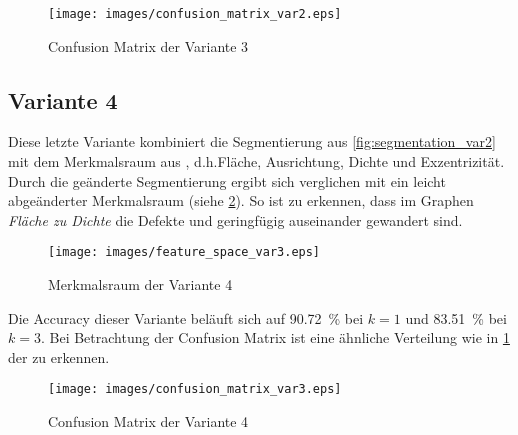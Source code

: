 \begin{figure}[ht]
    \centering
    \texttt{[image: images/confusion\_matrix\_var2.eps]}
    \caption{\foreignlanguage{english}{Confusion Matrix} der Variante 3\label{fig:confusion_matrix_var2}}
\end{figure}

\FloatBarrier{}

\subsection{Variante 4\label{sct:variant3}}

Diese letzte Variante kombiniert die Segmentierung aus \cref{fig:segmentation_var2} mit dem Merkmalsraum aus , d.h.\@ Fläche, Ausrichtung, Dichte und Exzentrizität. Durch die geänderte Segmentierung ergibt sich verglichen mit  ein leicht abgeänderter Merkmalsraum (siehe \cref{fig:feature_space_var3}). So ist zu erkennen, dass im Graphen \emph{Fläche zu Dichte} die Defekte  und  geringfügig auseinander gewandert sind.

\begin{figure}[ht]
    \centering
    \texttt{[image: images/feature\_space\_var3.eps]}
    \caption{Merkmalsraum der Variante 4\label{fig:feature_space_var3}}
\end{figure}

Die \foreignlanguage{english}{Accuracy} dieser Variante beläuft sich auf \SI{90.72}{\percent} bei \(k = 1\) und \SI{83.51}{\percent} bei \(k = 3\). Bei Betrachtung der \foreignlanguage{english}{Confusion Matrix} ist eine ähnliche Verteilung wie in \cref{fig:confusion_matrix_var2} der  zu erkennen.

\begin{figure}[ht]
    \centering
    \texttt{[image: images/confusion\_matrix\_var3.eps]}
    \caption{\foreignlanguage{english}{Confusion Matrix} der Variante 4\label{fig:confusion_matrix_var3}}
\end{figure}
